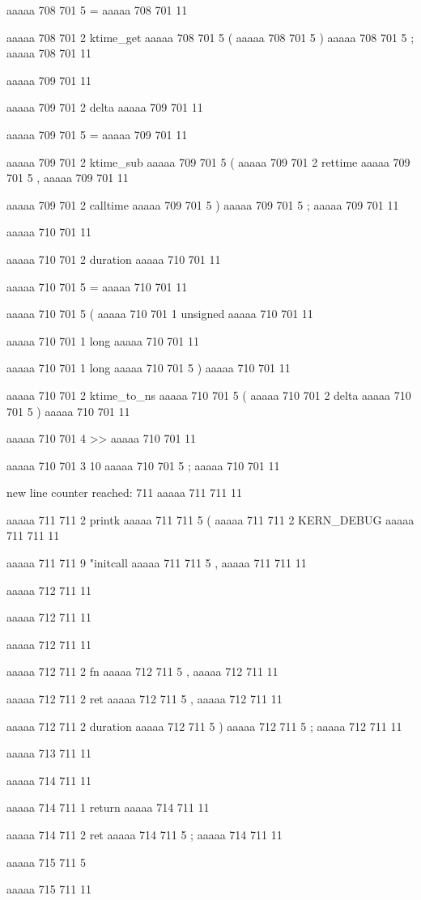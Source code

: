 {aaaaa 708 701
5
=
aaaaa 708 701
11
 
aaaaa 708 701
2
ktime_get
aaaaa 708 701
5
(
aaaaa 708 701
5
)
aaaaa 708 701
5
;
aaaaa 708 701
11


aaaaa 709 701
11
	
aaaaa 709 701
2
delta
aaaaa 709 701
11
 
aaaaa 709 701
5
=
aaaaa 709 701
11
 
aaaaa 709 701
2
ktime_sub
aaaaa 709 701
5
(
aaaaa 709 701
2
rettime
aaaaa 709 701
5
,
aaaaa 709 701
11
 
aaaaa 709 701
2
calltime
aaaaa 709 701
5
)
aaaaa 709 701
5
;
aaaaa 709 701
11


aaaaa 710 701
11
	
aaaaa 710 701
2
duration
aaaaa 710 701
11
 
aaaaa 710 701
5
=
aaaaa 710 701
11
 
aaaaa 710 701
5
(
aaaaa 710 701
1
unsigned
aaaaa 710 701
11
 
aaaaa 710 701
1
long
aaaaa 710 701
11
 
aaaaa 710 701
1
long
aaaaa 710 701
5
)
aaaaa 710 701
11
 
aaaaa 710 701
2
ktime_to_ns
aaaaa 710 701
5
(
aaaaa 710 701
2
delta
aaaaa 710 701
5
)
aaaaa 710 701
11
 
aaaaa 710 701
4
>>
aaaaa 710 701
11
 
aaaaa 710 701
3
10
aaaaa 710 701
5
;
aaaaa 710 701
11


new line counter reached: 711
aaaaa 711 711
11
	
aaaaa 711 711
2
printk
aaaaa 711 711
5
(
aaaaa 711 711
2
KERN_DEBUG
aaaaa 711 711
11
 
aaaaa 711 711
9
"initcall %
aaaaa 711 711
5
,
aaaaa 711 711
11


aaaaa 712 711
11
	
aaaaa 712 711
11
	
aaaaa 712 711
11
 
aaaaa 712 711
2
fn
aaaaa 712 711
5
,
aaaaa 712 711
11
 
aaaaa 712 711
2
ret
aaaaa 712 711
5
,
aaaaa 712 711
11
 
aaaaa 712 711
2
duration
aaaaa 712 711
5
)
aaaaa 712 711
5
;
aaaaa 712 711
11


aaaaa 713 711
11


aaaaa 714 711
11
	
aaaaa 714 711
1
return
aaaaa 714 711
11
 
aaaaa 714 711
2
ret
aaaaa 714 711
5
;
aaaaa 714 711
11


aaaaa 715 711
5
}
aaaaa 715 711
11


